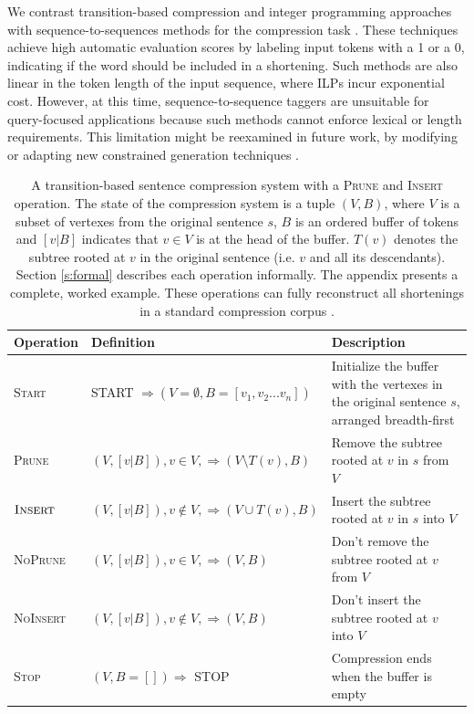 \documentclass[11pt,a4paper]{article}
\begin{document}
We contrast transition-based compression and integer programming approaches with sequence-to-sequences methods for the compression task \cite{filippova2015sentence}. These techniques achieve high automatic evaluation scores by labeling input tokens with a 1 or a 0, indicating if the word should be included in a shortening. Such methods are also linear in the token length of the input sequence, where ILPs incur exponential cost. However, at this time, sequence-to-sequence taggers are unsuitable for query-focused applications because such methods cannot enforce lexical or length requirements. This limitation might be reexamined in future work, by modifying or adapting new constrained generation techniques \cite{N18-1119,aaimh}.


\begin{table}[]
\centering
\begin{tabular}{llp{70mm}}
\textbf{Operation} &             \textbf{Definition}                                                    &      \textbf{Description}    \\ \hline
\textsc{Start}      & START $\Rightarrow ( V=\emptyset,  B=[v_1, v_2 ... v_n])$ & Initialize the buffer with the vertexes in the original sentence $s$, arranged breadth-first \\ \hline
\textsc{Prune}              & $(V, [v|B]), v \in V,  \Rightarrow (V \setminus  T(v), B)$ & Remove the subtree rooted at $v$ in $s$ from $V$ \\  
$\textsc{Insert}$             & $(V, [v|B]), v \notin V, \Rightarrow (V \cup T(v), B)$ & Insert the subtree rooted at $v$ in $s$ into $V$  \\ \hline
\textsc{NoPrune}           & $(V, [v|B]), v \in V, \Rightarrow (V, B)$ & Don't remove the subtree rooted at $v$ from $V$  \\ 
\textsc{NoInsert}          &       $(V, [v|B]), v \notin V, \Rightarrow (V, B)$ &   Don't insert the subtree rooted at $v$ into $V$    \\ \hline
\textsc{Stop}             & $ (V, B=[]) \Rightarrow$ STOP & Compression ends when the buffer is empty \\                                               
\end{tabular}
\caption{A transition-based sentence compression system with a \textsc{Prune} and \textsc{Insert} operation. The state of the compression system is a tuple $(V, B)$, where $V$ is a subset of vertexes from the original sentence $s$, $B$ is an ordered buffer of tokens and $[v|B]$ indicates that $v \in V$ is at the head of the buffer. $T(v)$ denotes the subtree rooted at $v$ in the original sentence (i.e. $v$ and all its descendants). Section \ref{s:formal} describes each operation informally. The appendix presents a complete, worked example. These operations can fully reconstruct all shortenings in a standard compression corpus \cite{filippova2013overcoming}.}
\label{t:ops}
\end{table}
\end{document}
